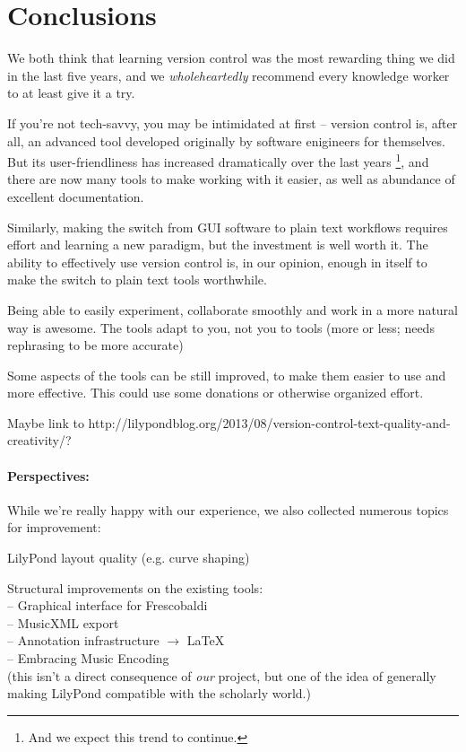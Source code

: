 \documentclass[11pt,a4paper]{article}
\begin{document}
\section{Conclusions}\label{sec:conclusions}

We both think that learning version control was the most rewarding thing we did
in the last five years, and we \emph{wholeheartedly} recommend every knowledge
worker to at least give it a try.

If you're not tech-savvy, you may be intimidated at first -- version control
is, after all, an advanced tool developed originally by software enigineers
for themselves.  But its user-friendliness has increased dramatically over the
last years%
\footnote{And we expect this trend to continue.},
and there are now many tools to make working with it easier, as well as abundance
of excellent documentation.

Similarly, making the switch from \textsc{GUI} software to plain text workflows
requires effort and learning a new paradigm, but the investment is well worth it.
The ability to effectively use version control is, in our opinion, enough in itself
to make the switch to plain text tools worthwhile.

Being able to easily experiment, collaborate smoothly and work in a more natural way
is awesome.  The tools adapt to you, not you to tools (more or less; needs rephrasing to be more accurate)

Some aspects of the tools can be still improved, to make them easier to use and more
effective.  This could use some donations or otherwise organized effort.

Maybe link to http://lilypondblog.org/2013/08/version-control-text-quality-and-creativity/?

\paragraph{Perspectives:}
While we're really happy with our experience, we also collected numerous topics for
improvement:
\begin{itemize*}
\item LilyPond layout quality (e.g. curve shaping)
\item Structural improvements on the existing tools:\\
-- Graphical interface for Frescobaldi\\
-- MusicXML export\\
-- Annotation infrastructure $\rightarrow$ \LaTeX\\
-- Embracing Music Encoding\\
(this isn't a direct consequence of \emph{our} project, but one of the idea of
generally making LilyPond compatible with the scholarly world.)

\end{itemize*}
\end{document}
